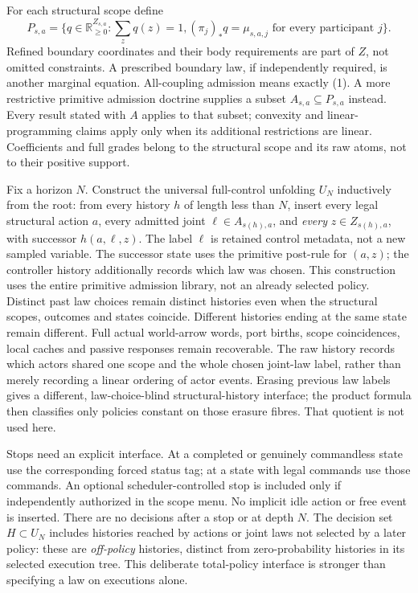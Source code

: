 \documentclass[11pt]{article}
\begin{document}
For each structural scope define
\[
 P_{s,a}=\{q\in\mathbb R_{\geq0}^{Z_{s,a}}:\sum_zq(z)=1,
                  (\pi_j)_*q=\mu_{s,a,j}\text{ for every participant }j\}. \tag{1}
\]
Refined boundary coordinates and their body requirements are part of $Z$, not omitted constraints. A prescribed boundary law, if independently required, is another marginal equation. All-coupling admission means exactly (1). A more restrictive primitive admission doctrine supplies a subset $A_{s,a}\subseteq P_{s,a}$ instead. Every result stated with $A$ applies to that subset; convexity and linear-programming claims apply only when its additional restrictions are linear. Coefficients and full grades belong to the structural scope and its raw atoms, not to their positive support.

Fix a horizon $N$. Construct the universal full-control unfolding $U_N$ inductively from the root: from every history $h$ of length less than $N$, insert every legal structural action $a$, every admitted joint $\ell\in A_{s(h),a}$, and \emph{every} $z\in Z_{s(h),a}$, with successor $h(a,\ell,z)$. The label $\ell$ is retained control metadata, not a new sampled variable. The successor state uses the primitive post-rule for $(a,z)$; the controller history additionally records which law was chosen. This construction uses the entire primitive admission library, not an already selected policy. Distinct past law choices remain distinct histories even when the structural scopes, outcomes and states coincide. Different histories ending at the same state remain different. Full actual world-arrow words, port births, scope coincidences, local caches and passive responses remain recoverable. The raw history records which actors shared one scope and the whole chosen joint-law label, rather than merely recording a linear ordering of actor events. Erasing previous law labels gives a different, law-choice-blind structural-history interface; the product formula then classifies only policies constant on those erasure fibres. That quotient is not used here.

Stops need an explicit interface. At a completed or genuinely commandless state use the corresponding forced status tag; at a state with legal commands use those commands. An optional scheduler-controlled stop is included only if independently authorized in the scope menu. No implicit idle action or free event is inserted. There are no decisions after a stop or at depth $N$. The decision set $H\subset U_N$ includes histories reached by actions or joint laws not selected by a later policy: these are \emph{off-policy} histories, distinct from zero-probability histories in its selected execution tree. This deliberate total-policy interface is stronger than specifying a law on executions alone.
\end{document}
